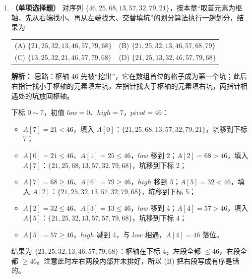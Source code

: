 \begin{enumerate}
\ifshowsolutions\par\noindent\textbf{解析：} 思路：一趟冒泡只保证把当前未排序部分的最大元素送到末尾，中途元素只能靠相邻交换逐步挪动，不会“跳”成完全有序。

按 $j=0,1,\ldots,4$ 依次比较：
\[
\begin{aligned}
\{5,1,4,2,8,3\} &\xrightarrow{5>1} \{1,5,4,2,8,3\}
\xrightarrow{5>4} \{1,4,5,2,8,3\}\\
&\xrightarrow{5>2} \{1,4,2,5,8,3\}
\xrightarrow{5<8} \{1,4,2,5,8,3\}\\
&\xrightarrow{8>3} \{1,4,2,5,3,8\}.
\end{aligned}
\]
共比较 $n-1=5$ 次，交换 4 次；最大值 8 落到最后一个位置，但前面的 $4$ 与 $2$ 仍未就位，这正是“一趟”与“有序”的区别。

\else \answerarea \fi

\item \textbf{（单项选择题）} 对序列 $\{46,25,68,13,57,32,79,21\}$，按本章“取首元素为枢轴、先从右端找小、再从左端找大、交替填坑”的划分算法执行一趟划分，结果为
\begin{center}
\begin{tabularx}{0.96\linewidth}{@{}XX@{}}
(A) $\{21,25,32,13,46,57,79,68\}$ & (B) $\{21,25,32,13,46,57,68,79\}$ \\[4pt]
(C) $\{13,25,32,21,46,57,79,68\}$ & (D) $\{21,25,13,32,46,57,79,68\}$
\end{tabularx}
\end{center}

\ifshowsolutions\par\noindent\textbf{解析：} 思路：枢轴 46 先被“挖出”，它在数组首位的格子成为第一个坑；此后右指针找小于枢轴的元素填左坑，左指针找大于枢轴的元素填右坑，两指针相遇处的坑放回枢轴。

下标 $0\sim 7$，初值 $low=0$、$high=7$，$pivot=46$：
\begin{itemize}
\item $A[7]=21<46$，填入 $A[0]$：$\{21,25,68,13,57,32,79,21\}$，坑移到下标 7；
\item $A[0]=21\leqslant 46$、$A[1]=25\leqslant 46$，$low$ 移到 2；$A[2]=68>46$，填入 $A[7]$：$\{21,25,68,13,57,32,79,68\}$，坑移到下标 2；
\item $A[7]=68\geqslant 46$、$A[6]=79\geqslant 46$，$high$ 移到 5；$A[5]=32<46$，填入 $A[2]$：$\{21,25,32,13,57,32,79,68\}$，坑移到下标 5；
\item $A[2]=32\leqslant 46$、$A[3]=13\leqslant 46$，$low$ 移到 4；$A[4]=57>46$，填入 $A[5]$：$\{21,25,32,13,57,57,79,68\}$，坑移到下标 4；
\item $A[5]=57\geqslant 46$，$high$ 减到 4，与 $low$ 相遇，$A[4]=46$ 落位。
\end{itemize}
结果为 $\{21,25,32,13,46,57,79,68\}$：枢轴在下标 4，左段全都 $\leqslant 46$，右段全都 $\geqslant 46$。注意此时左右两段内部并未排好，所以 (B) 把右段写成有序是错的。


\end{enumerate}
